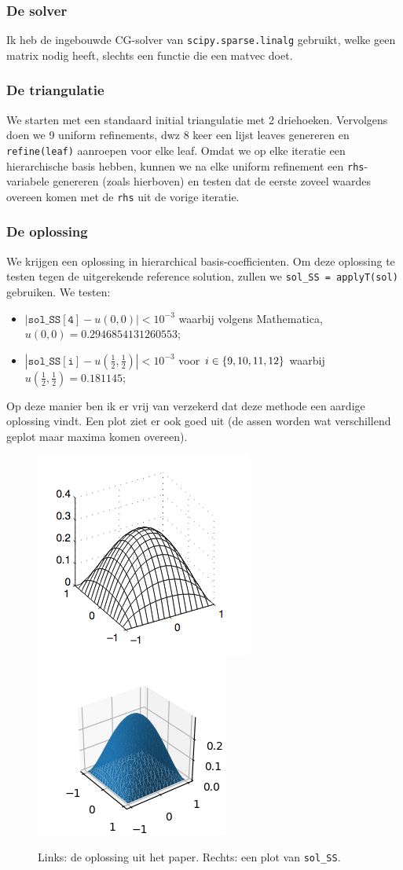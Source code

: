 \documentclass[11pt,a4paper]{amsart}
\theoremstyle{definition}
\begin{document}
\subsubsection*{De solver}
Ik heb de ingebouwde CG-solver van \texttt{scipy.sparse.linalg} gebruikt, welke
geen matrix nodig heeft, slechts een functie die een matvec doet.

\subsubsection*{De triangulatie}
We starten met een standaard initial triangulatie met 2 driehoeken. Vervolgens
doen we 9 uniform refinements, dwz 8 keer een lijst leaves genereren en
\texttt{refine(leaf)} aanroepen voor elke leaf. Omdat we op elke iteratie een
hierarchische basis hebben, kunnen we na elke uniform refinement een \texttt{rhs}-variabele
genereren (zoals hierboven) en testen dat de eerste zoveel waardes overeen komen
met de \texttt{rhs} uit de vorige iteratie.

\subsubsection*{De oplossing}
We krijgen een oplossing in hierarchical basis-coefficienten. Om deze oplossing
te testen tegen de uitgerekende reference solution, zullen we \texttt{sol\_SS = applyT(sol)}
gebruiken. We testen:
\begin{itemize}
  \item $|\mathtt{sol\_SS[4]} - u(0,0)| < 10^{-3}$ waarbij volgens Mathematica, $u(0,0) = 0.2946854131260553$;
  \item $|\mathtt{sol\_SS[i]} - u(\tfrac{1}{2},\tfrac{1}{2})| < 10^{-3}$ voor $i \in \set{9, 10, 11, 12}$ waarbij $u(\tfrac{1}{2},\tfrac{1}{2}) = 0.181145$;
\end{itemize}
Op deze manier ben ik er vrij van verzekerd dat deze methode een aardige oplossing
vindt. Een plot ziet er ook goed uit (de assen worden wat verschillend geplot maar maxima komen overeen).
\begin{figure}[b]
  \centering
  \includegraphics[width=0.3\linewidth]{img/paper-sol}
  \includegraphics[width=0.3\linewidth]{img/fe-sol}
  \caption{Links: de oplossing uit het paper. Rechts: een plot van \texttt{sol\_SS}.}
\end{figure}
\clearpage
\end{document}
